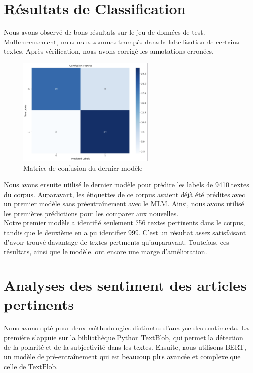 \documentclass{article}
\begin{document}
\section*{Résultats de Classification}

Nous avons observé de bons résultats sur le jeu de données de test. Malheureusement, nous nous sommes trompés dans la labellisation de certains textes. Après vérification, nous avons corrigé les annotations erronées.

\begin{figure}[!htbp]
    \centering
    \includegraphics[width=0.6\textwidth]{confusion2.png}
    \caption{Matrice de confusion du dernier modèle}
    \label{fig:plots}
\end{figure}

Nous avons ensuite utilisé le dernier modèle pour prédire les labels de 9410 textes du corpus. Auparavant, les étiquettes de ce corpus avaient déjà été prédites avec un premier modèle sans préentraînement avec le MLM. Ainsi, nous avons utilisé les premières prédictions pour les comparer aux nouvelles.\\

Notre premier modèle a identifié seulement 356 textes pertinents dans le corpus, tandis que le deuxième en a pu identifier 999. C'est un résultat assez satisfaisant d'avoir trouvé davantage de textes pertinents qu'auparavant. Toutefois, ces résultats, ainsi que le modèle, ont encore une marge d'amélioration.


\section{Analyses des sentiment des articles pertinents}

Nous avons opté pour deux méthodologies distinctes d'analyse des sentiments. La première s'appuie sur la bibliothèque Python TextBlob, qui permet la détection de la polarité et de la subjectivité dans les textes. Ensuite, nous utilisons BERT, un modèle de pré-entraînement qui est beaucoup plus avancée et complexe que celle de TextBlob. \\
\end{document}
